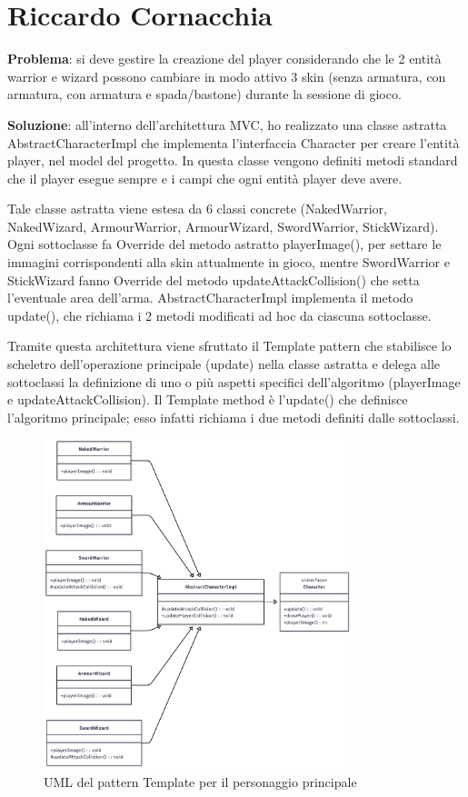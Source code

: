 \documentclass[a4paper,12pt]{report}
\begin{document}
\section{Riccardo Cornacchia}

\textbf{Problema}: si deve gestire la creazione del player considerando che le 2 entità warrior e wizard possono cambiare in modo attivo 3 skin
(senza armatura, con armatura, con armatura e spada/bastone) durante la sessione di gioco.\vspace{1cm}

\textbf{Soluzione}: all'interno dell'architettura MVC, ho realizzato una classe astratta AbstractCharacterImpl che implementa l'interfaccia 
Character per creare l'entità player, nel model del progetto. In questa classe vengono definiti metodi standard che il player esegue sempre 
e i campi che ogni entità player deve avere.

Tale classe astratta viene estesa da 6 classi concrete (NakedWarrior, NakedWizard, ArmourWarrior, ArmourWizard, SwordWarrior, 
StickWizard). Ogni sottoclasse fa Override del metodo astratto playerImage(), per settare le immagini corrispondenti alla skin 
attualmente in gioco, mentre SwordWarrior e StickWizard fanno Override del metodo updateAttackCollision() che setta l'eventuale area dell'arma.
AbstractCharacterImpl implementa il metodo update(), che richiama i 2 metodi modificati ad hoc da ciascuna sottoclasse.

Tramite questa architettura viene sfruttato il Template pattern che stabilisce lo scheletro dell'operazione 
principale (update) nella classe astratta e delega alle sottoclassi la definizione di uno o più aspetti specifici dell'algoritmo 
(playerImage e updateAttackCollision). Il Template method è l'update() che definisce l'algoritmo principale; esso infatti richiama i due 
metodi definiti dalle sottoclassi.

\begin{figure}
    \centering
    \includegraphics[width=0.8\textwidth]{resources/TemplateCharacter.png}
    \caption{UML del pattern Template per il personaggio principale}
    \label{fig:2.1}
\end{figure}
\end{document}
